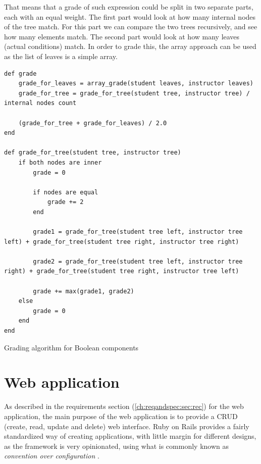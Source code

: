 That means that a grade of such expression could be split in two separate parts, each with an equal weight. The first part would look at how many internal nodes of the tree match. For this part we can compare the two trees recursively, and see how many elements match. The second part would look at how many leaves (actual conditions) match. In order to grade this, the array approach can be used as the list of leaves is a simple array.

\begin{code}
\begin{verbatim}
def grade
    grade_for_leaves = array_grade(student leaves, instructor leaves)
    grade_for_tree = grade_for_tree(student tree, instructor tree) / internal nodes count
    
    (grade_for_tree + grade_for_leaves) / 2.0
end

def grade_for_tree(student tree, instructor tree)
    if both nodes are inner
        grade = 0
        
        if nodes are equal
            grade += 2
        end
        
        grade1 = grade_for_tree(student tree left, instructor tree left) + grade_for_tree(student tree right, instructor tree right)
        
        grade2 = grade_for_tree(student tree left, instructor tree right) + grade_for_tree(student tree right, instructor tree left)
        
        grade += max(grade1, grade2)
    else
        grade = 0
    end
end
\end{verbatim}
\caption{Grading algorithm for Boolean components }
\end{code}

\section{Web application}


As described in the requirements section (\ref{ch:reqandspec:sec:rec}) for the web application, the main purpose of the web application is to provide a CRUD (create, read, update and delete) web interface. Ruby on Rails provides a fairly standardized way of creating applications, with little margin for different designs, as the framework is very opinionated, using what is commonly known as \textit{convention over configuration} \citep{ruby_on_rails}.

